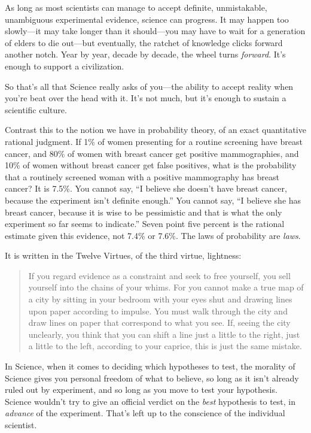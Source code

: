 {
 As long as most scientists can manage to accept definite,
unmistakable, unambiguous experimental evidence, science can progress.
It may happen too slowly---it may take longer than it should---you may
have to wait for a generation of elders to die out---but eventually,
the ratchet of knowledge clicks forward another notch. Year by year,
decade by decade, the wheel turns \textit{forward}.
It's enough to support a civilization.}

{
 So that's all that Science really asks of
you---the ability to accept reality when you're beat
over the head with it. It's not much, but
it's enough to sustain a scientific culture.}

{
 Contrast this to the notion we have in probability theory, of an
exact quantitative rational judgment. If 1\% of women presenting for a
routine screening have breast cancer, and 80\% of women with breast
cancer get positive mammographies, and 10\% of women without breast
cancer get false positives, what is the probability that a routinely
screened woman with a positive mammography has breast cancer? It is
7.5\%. You cannot say, ``I believe she
doesn't have breast cancer, because the experiment
isn't definite enough.'' You cannot
say, ``I believe she has breast cancer, because it is
wise to be pessimistic and that is what the only experiment so far
seems to indicate.'' Seven point five percent is the
rational estimate given this evidence, not 7.4\% or 7.6\%. The laws of
probability are \textit{laws}.}

{
 It is written in the Twelve Virtues, of the third virtue,
lightness:}

\begin{quote}
{
 If you regard evidence as a constraint and seek to free yourself,
you sell yourself into the chains of your whims. For you cannot make a
true map of a city by sitting in your bedroom with your eyes shut and
drawing lines upon paper according to impulse. You must walk through
the city and draw lines on paper that correspond to what you see. If,
seeing the city unclearly, you think that you can shift a line just a
little to the right, just a little to the left, according to your
caprice, this is just the same mistake.}
\end{quote}

{
 In Science, when it comes to deciding which hypotheses to test,
the morality of Science gives you personal freedom of what to believe,
so long as it isn't already ruled out by experiment,
and so long as you move to test your hypothesis. Science
wouldn't try to give an official verdict on the
\textit{best} hypothesis to test, in \textit{advance} of the
experiment. That's left up to the conscience of the
individual scientist.}

